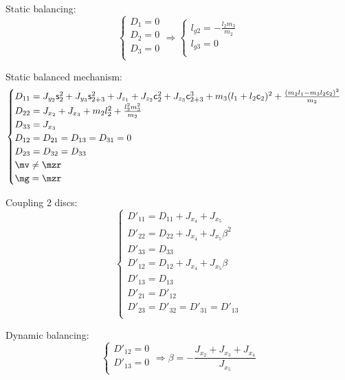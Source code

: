 \documentclass[a4paper,11pt,brazil,fleqn]{article}
\begin{document}
Static balancing:
\begin{equation}
\begin{cases}
D_1 = 0 \\
D_2 = 0 \\
D_3 = 0 \\
\end{cases}
\Rightarrow
\begin{cases}
l_{g2} = -\frac{l_2 m_3}{m_2} \\
l_{g3} = 0 \\
\end{cases}
\end{equation}

Static balanced mechanism:
\begin{equation}
\begin{cases}
D_{11} = J_{y_2}\ssin_2^2 + J_{y_3}\ssin_{2+3}^2 + J_{z_1} + J_{z_2}\ccos_2^2 + J_{z_3}\ccos_{2+3}^3 + m_3 (l_1 + l_2 \ccos_2)^2 + \frac{(m_2 l_1 - m_3 l_2 \ccos_2)^2}{m_2} \\
D_{22} = J_{x_2} + J_{x_3} + m_2 l_2^2 + \frac{l_2^2 m_3^2}{m_2} \\
D_{33} = J_{x_3} \\
D_{12} =  D_{21} = D_{13} = D_{31} = 0 \\
D_{23} = D_{32} = D_{33} \\
\mv \neq \mzr \\
\mg = \mzr
\end{cases}
\end{equation}

Coupling 2 discs:
\begin{equation}
\begin{cases}
D'_{11} = D_{11} + J_{x_4} + J_{x_5} \\
D'_{22} = D_{22} + J_{x_4} + J_{x_5} \beta^2 \\
D'_{33} = D_{33} \\
D'_{12} = D_{12} + J_{x_4} + J_{x_5} \beta \\
D'_{13} = D_{13} \\
D'_{21} = D'_{12} \\
D'_{23} = D'_{32} = D'_{31} = D'_{13}\\
\end{cases}
\end{equation}

Dynamic balancing:
\begin{equation}
\begin{cases}
D'_{12} = 0 \\
D'_{13} = 0 \\
\end{cases}
\Rightarrow \beta = -\frac{J_{x_2}+J_{x_3}+J_{x_4}}{J_{x_5}}
\end{equation}
\end{document}
